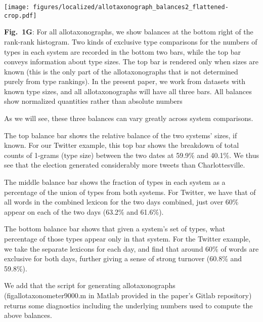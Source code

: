 \begin{center}
  \texttt{[image: figures/localized/allotaxonograph\_balances2\_flattened-crop.pdf]}
\end{center}
\begin{excerpt}
  \textbf{Fig.~1G}:
  For all allotaxonographs, we show balances at the bottom right
  of the rank-rank histogram.
  Two kinds of exclusive type comparisons for the numbers of types in each system
  are recorded in the bottom two bars,
  while the top bar conveys information about type sizes.
  The top bar is rendered only when sizes are known
  (this is the only part of the allotaxonographs that is not
  determined purely from type rankings).
  In the present paper, we work from datasets with known type sizes,
  and all allotaxonographs will have all three bars.
  All balances show normalized quantities rather than absolute numbers

  As we will see, these three balances can vary greatly across system comparisons.

  The top balance bar shows the relative balance of the two systems' sizes, if known.
  For our Twitter example, 
  this top bar shows the breakdown of total counts of 1-grams (type size)
  between the two dates at 59.9\% and 40.1\%.
  We thus see that the election generated considerably more tweets than Charlottesville.

  The middle balance bar shows the fraction of types in each system
  as a percentage of the union of types from both systems.
  For Twitter, we have that of all words in the combined lexicon for the two days combined,
  just over 60\% appear on each of the two days (63.2\% and 61.6\%).

  The bottom balance bar shows that given a system's set of types,
  what percentage of those types appear only in that system.
  For the Twitter example, we take the  separate lexicons for each day,
  and find that around 60\% of words are exclusive for both days,
  further giving a sense of strong turnover (60.8\% and 59.8\%).

  We add that the script for generating allotaxonographs
  (figallotaxonometer9000.m in Matlab provided in the paper's Gitlab repository)
  returns some diagnostics
  including the underlying numbers used to compute the above balances.
\end{excerpt}





